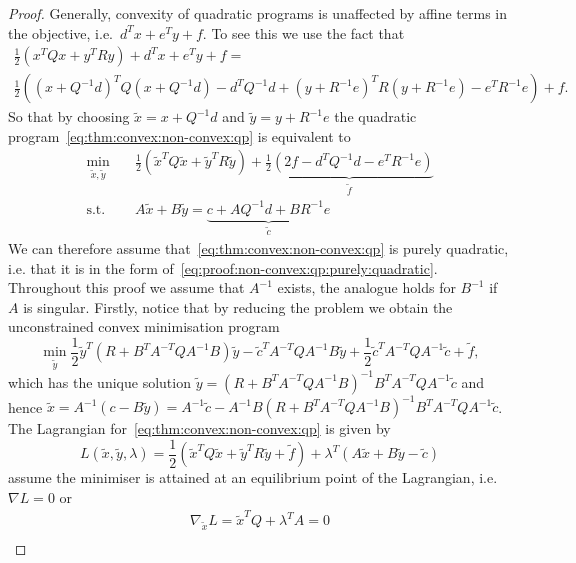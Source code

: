 \begin{proof}
Generally, convexity of quadratic programs is unaffected by affine terms in the objective, i.e.~$d^Tx+e^Ty+f$.
%
To see this we use the fact that 
%
$$\begin{aligned}
\frac{1}{2}(x^TQx+y^TRy)+d^Tx+e^Ty+f = \\\frac{1}{2}\left((x+Q^{-1}d)^TQ(x+Q^{-1}d) - d^TQ^{-1}d +(y+R^{-1}e)^T R(y+R^{-1}e)-e^TR^{-1}e\right)+f.\end{aligned}
$$
%
So that by choosing $\tilde x=x+Q^{-1}d$ and $\tilde y=y+R^{-1}e$ the quadratic program~\eqref{eq:thm:convex:non-convex:qp} is equivalent to
%
\begin{equation}\label{eq:proof:non-convex:qp:purely:quadratic}
\begin{aligned}
	\min_{\tilde x,\tilde y}&\quad \frac{1}{2}\left(\tilde x^TQ\tilde x+\tilde y^TR\tilde y\right) + \underbrace{\frac{1}{2}\left(2f-d^TQ^{-1}d-e^TR^{-1}e\right)}_{\tilde f}\\
	\text{s.t.}&\quad A\tilde x + B\tilde y = \underbrace{c+AQ^{-1}d+BR^{-1}e}_{\tilde c}
\end{aligned}\end{equation}
%
We can therefore assume that~\eqref{eq:thm:convex:non-convex:qp} is purely quadratic, i.e. that it is in the form of~\eqref{eq:proof:non-convex:qp:purely:quadratic}.
%
\\[1em]
%
Throughout this proof we assume that $A^{-1}$ exists, the analogue holds for $B^{-1}$ if $A$ is singular.
%
Firstly, notice that by reducing the problem we obtain the unconstrained convex minimisation program 
%
$$
\min_{\tilde y}\frac{1}{2}\tilde y^T(R+B^TA^{-T}QA^{-1}B)\tilde y-\tilde c^TA^{-T}QA^{-1}B\tilde y + \frac{1}{2}\tilde c^TA^{-T}QA^{-1}\tilde c+\tilde f,
$$
%
which has the unique solution $\tilde y = (R+B^TA^{-T}QA^{-1}B)^{-1}B^TA^{-T}QA^{-1}\tilde c$ and hence $\tilde x=A^{-1}(c-B\tilde y) = A^{-1}\tilde c-A^{-1}B(R+B^TA^{-T}QA^{-1}B)^{-1}B^TA^{-T}QA^{-1}\tilde c$.
\\[1em]
The Lagrangian for~\eqref{eq:thm:convex:non-convex:qp} is given by
%
\begin{equation}
	L(\tilde x,\tilde y,\lambda) = \frac{1}{2}(\tilde x^TQ\tilde x+\tilde y^TR\tilde y +\tilde f) + \lambda^T(A\tilde x+B\tilde y - \tilde c)
\end{equation}
%
assume the minimiser is attained at an equilibrium point of the Lagrangian, i.e. $\nabla L = 0$ or
%
\begin{align}
	\nabla_{\tilde x} L = \tilde x^TQ+\lambda^T A = 0\\

\end{align}
\end{proof}
